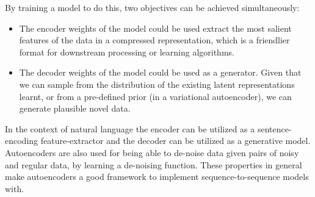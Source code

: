 By training a model to do this, two objectives can be achieved simultaneously:
\begin{itemize}
	\item The encoder weights of the model could be used extract the most salient features of the data in a compressed representation, which is a friendlier format for downstream processing or learning algorithms. \citep{hinton2006reducing}
	\item The decoder weights of the model could be used as a generator. Given that we can sample from the distribution of the existing latent representations learnt, or from a pre-defined prior (in a variational autoencoder), we can generate plausible novel data.
\end{itemize}

In the context of natural language the encoder can be utilized as a sentence-encoding feature-extractor and the decoder can be utilized as a generative model. Autoencoders are also used for being able to de-noise data given pairs of noisy and regular data, by learning a de-noising function. These properties in general make autoencoders a good framework to implement sequence-to-sequence models with.
